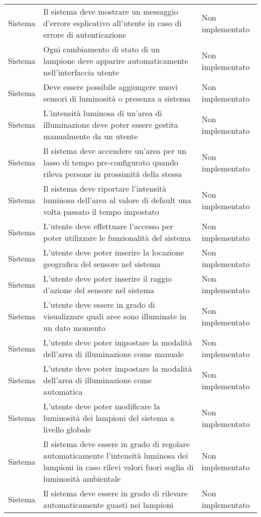 \begin{center}
\begin{xltabular}{\linewidth}{|l|X|l|}
        \hline
        Sistema & Il sistema deve mostrare un messaggio d'errore esplicativo all'utente in caso di errore di autenticazione & Non implementato\\
        Sistema & Ogni cambiamento di stato di un lampione deve apparire automaticamente nell'interfaccia utente & Non implementato\\
        Sistema & Deve essere possibile aggiungere nuovi sensori di luminosità o presenza a sistema & Non implementato\\
        Sistema & L'intensità luminosa di un'area di illuminazione deve poter essere gestita manualmente da un utente & Non implementato\\
        Sistema & Il sistema deve accendere un'area per un lasso di tempo pre-configurato quando rileva persone in prossimità della stessa & Non implementato\\
        Sistema & Il sistema deve riportare l'intensità luminosa dell'area al valore di default una volta passato il tempo impostato & Non implementato\\
        Sistema & L'utente deve effettuare l'accesso per poter utilizzare le funzionalità del sistema & Non implementato\\
        Sistema & L'utente deve poter inserire la locazione geografica del sensore nel sistema & Non implementato\\
        Sistema & L'utente deve poter inserire il raggio d'azione del sensore nel sistema & Non implementato\\
        Sistema & L'utente deve essere in grado di visualizzare quali aree sono illuminate in un dato momento & Non implementato\\
        Sistema & L'utente deve poter impostare la modalità dell'area di illuminazione come manuale & Non implementato\\
        Sistema & L'utente deve poter impostare la modalità dell'area di illuminazione come automatica & Non implementato\\
        Sistema & L'utente deve poter modificare la luminosità dei lampioni del sistema a livello globale & Non implementato\\
        Sistema & Il sistema deve essere in grado di regolare automaticamente l'intensità luminosa dei lampioni in caso rilevi valori fuori soglia di luminosità ambientale & Non implementato\\
        Sistema & Il sistema deve essere in grado di rilevare automaticamente guasti nei lampioni & Non implementato\\

\end{xltabular}
\end{center}
